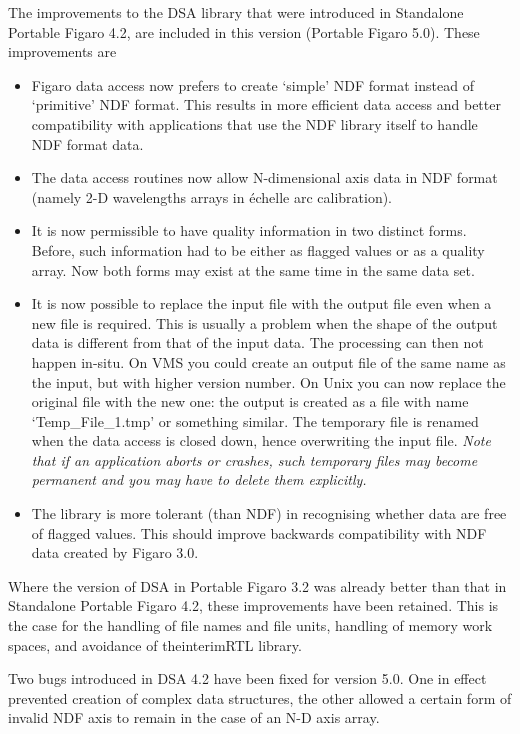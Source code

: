    The improvements to the DSA library that were introduced in
   Standalone Portable Figaro 4.2, are included in this version
   (Portable Figaro 5.0). These improvements are

\begin{itemize}
\item Figaro data access now prefers to create `simple' NDF format
   instead of `primitive' NDF format. This results in more efficient
   data access and better compatibility with applications that use the
   NDF library itself to handle NDF format data.
\item The data access routines now allow N-dimensional axis data in NDF
   format (namely 2-D wavelengths arrays in \'echelle arc calibration).
\item It is now permissible to have quality information in two distinct
   forms. Before, such information had to be either as flagged values or
   as a quality array. Now both forms may exist at the same time in the
   same data set.
\item It is now possible to replace the input file with the output file
   even when a new file is required. This is usually a problem when the
   shape of the output data is different from that of the input data.
   The processing can then not happen in-situ. On VMS you could create
   an output file of the same name as the input, but with higher
   version number. On Unix you can now replace the original file with
   the new one: the output is created as a file with name `Temp\_File\_1.tmp'
   or something similar. The temporary file is renamed when the data access
   is closed down, hence overwriting the input file. {\em Note that if
   an application aborts or crashes, such temporary files may become
   permanent and you may have to delete them explicitly.}
\item The library is more tolerant (than NDF) in recognising whether
   data are free of flagged values. This should improve
   backwards compatibility with NDF data created by Figaro 3.0.
\end{itemize}

   Where the version of DSA in Portable Figaro 3.2 was already better
   than that in Standalone Portable Figaro 4.2, these improvements have
   been retained. This is the case for the handling of file names and
   file units, handling of memory work spaces, and avoidance of
   the\latorhtm{---}{-}interim\latorhtm{---}{-}RTL library.

   Two bugs introduced
   in DSA 4.2 have been fixed for version 5.0. One in effect
   prevented creation of complex data structures, the other allowed a
   certain form of invalid NDF axis to remain in the case of an N-D axis
   array.


